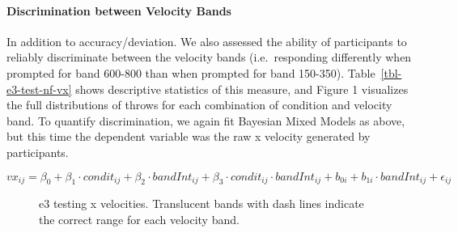 \documentclass[
  letterpaper,
  DIV=11,
  numbers=noendperiod,
  oneside]{scrartcl}
\let\oldparagraph\paragraph
\renewcommand{\paragraph}[1]{\oldparagraph{#1}\mbox{}}
\begin{document}
\paragraph{Discrimination between Velocity
Bands}\label{discrimination-between-velocity-bands-1}

In addition to accuracy/deviation. We also assessed the ability of
participants to reliably discriminate between the velocity bands
(i.e.~responding differently when prompted for band 600-800 than when
prompted for band 150-350). Table~\ref{tbl-e3-test-nf-vx} shows
descriptive statistics of this measure, and Figure 1 visualizes the full
distributions of throws for each combination of condition and velocity
band. To quantify discrimination, we again fit Bayesian Mixed Models as
above, but this time the dependent variable was the raw x velocity
generated by participants.

\begin{equation}
vx_{ij} = \beta_0 + \beta_1 \cdot condit_{ij} + \beta_2 \cdot bandInt_{ij} + \beta_3 \cdot condit_{ij} \cdot bandInt_{ij} + b_{0i} + b_{1i} \cdot bandInt_{ij} + \epsilon_{ij}
\end{equation}

\begin{figure}


\caption{\label{fig-e3-test-vx}e3 testing x velocities. Translucent
bands with dash lines indicate the correct range for each velocity
band.}

\end{figure}%
\end{document}

